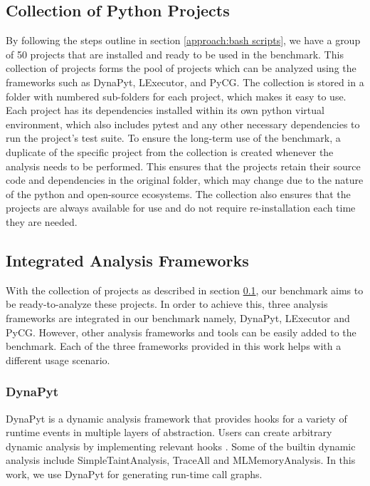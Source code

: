\subsection{Collection of Python Projects}
\label{approach:collection of projects}
By following the steps outline in section \ref{approach:bash scripts}, we have a group of 50 projects that are installed and ready to be used in the benchmark.
This collection of projects forms the pool of projects which can be analyzed using the frameworks such as DynaPyt, LExecutor, and PyCG.
The collection is stored in a folder with numbered sub-folders for each project, which makes it easy to use.
Each project has its dependencies installed within its own python virtual environment, which also includes pytest and any other necessary dependencies to run the project's test suite.
To ensure the long-term use of the benchmark, a duplicate of the specific project from the collection is created whenever the analysis needs to be performed. 
This ensures that the projects retain their source code and dependencies in the original folder, which may change due to the nature of the python and open-source ecosystems.
The collection also ensures that the projects are always available for use and do not require re-installation each time they are needed.   

\subsection{Integrated Analysis Frameworks}
\label{approach:analysis framework}
With the collection of projects as described in section \ref{approach:collection of projects}, our benchmark aims to be ready-to-analyze these projects.
In order to achieve this, three analysis frameworks are integrated in our benchmark namely, DynaPyt, LExecutor and PyCG. However, other analysis frameworks and tools can be easily added to the benchmark.
Each of the three frameworks provided in this work helps with a different usage scenario.
\subsubsection{DynaPyt}
DynaPyt is a dynamic analysis framework that provides hooks for a variety of runtime events in multiple layers of abstraction.
Users can create arbitrary dynamic analysis by implementing relevant hooks \cite{DynaPyt2022}. Some of the builtin dynamic analysis include SimpleTaintAnalysis, TraceAll and MLMemoryAnalysis.
In this work, we use DynaPyt for generating run-time call graphs.
